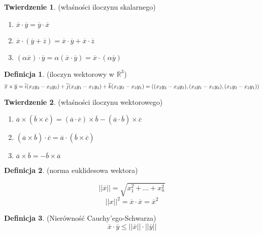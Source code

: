 \documentclass{article}
\theoremstyle{definition}
\newtheorem{de}{Definicja}[subsection]
\theoremstyle{definition}
\newtheorem{tw}{Twierdzenie}[subsection]
\theoremstyle{definition}
\begin{document}
\begin{tw}
(właśności iloczynu skalarnego)

\begin{enumerate}
\item $ \overline{x} \cdot \overline{y} = \overline{y}  \cdot \overline{x} $
\item $ \overline{x}\cdot (\overline{y}+\overline{z}) =
        \overline{x}\cdot\overline{y}+\overline{x}\cdot\overline{z} $
\item $ (\alpha\overline{x}) \cdot \overline{y}=
        \alpha(\overline{x} \cdot \overline{y})= 
        \overline{x} \cdot (\alpha\overline{y}) $
\end{enumerate}
\end{tw}

\begin{de}
(iloczyn wektorowy w $\mathbb{R}^3$)
$$
\overline{x} \times \overline{y} =
 \overline{i} (x_2y_3-x_3y_2)
+\overline{j} (x_3y_1-x_1y_3)
+\overline{k} (x_1y_2-x_2y_1) = \\
((x_2y_3-x_3y_2), (x_3y_1-x_1y_3), (x_1y_2-x_2y_1))
$$
\end{de}

\begin{tw}
(właśności iloczynu wektorowego)

\begin{enumerate}
\item $\overline{a} \times (\overline{b} \times \overline{c})
      = (\overline{a} \cdot \overline{c}) \times \overline{b}
      - (\overline{a} \cdot \overline{b}) \times \overline{c} $
\item $(\overline{a} \times \overline{b}) \cdot \overline{c} = 
        \overline{a}\cdot(\overline{b}\times\overline{c}) $
\item $ \overline{a}\times\overline{b}=
       -\overline{b}\times\overline{a} $
\end{enumerate}
\end{tw}

\begin{de}
(norma euklidesowa wektora)

$$
||\overline{x}|| = \sqrt{x_1^2+...+x_n^2}
$$
$$
||x||^2 = \overline{x} \cdot \overline{x} = \overline{x}^2
$$
\end{de}

\begin{de}
(Nierówność Cauchy'ego-Schwarza)
$$
\overline{x} \cdot \overline{y} \leq 
||\overline{x}|| \cdot ||\overline{y}||
$$
\end{de}
\end{document}
